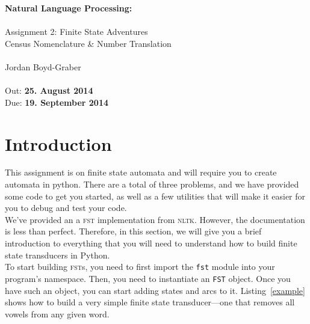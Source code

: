 \documentclass[11pt]{article}
\begin{document}
\begin{center}
{\Large{\textbf{ Natural Language Processing:  }}}\\
\mbox{}\\
{\Large{Assignment 2: Finite State Adventures\\Census Nomenclature \& Number Translation}}\\
\mbox{}\\
{\large{Jordan Boyd-Graber}}\\
\mbox{}\\
{\large{Out: \textbf{25. August 2014}\\Due: \textbf{19. September 2014}}}\\
\end{center}


{}

\section*{Introduction} %
\label{sec:introduction}

This assignment is on finite state automata and will require you to
create automata in python. There are a total of three problems, and we
have provided some code to get you started, as well as a few utilities
that will make it easier for you to debug and test your code.  \\

We've provided an a \textsc{fst} implementation from \textsc{nltk}.
However, the documentation is less than perfect. Therefore, in this
section, we will give you a brief introduction to everything that you
will need to understand how to build finite state transducers in Python.
\\

To start building \textsc{fst}s, you need to first import the
\texttt{fst} module into your program's namespace. Then, you need to
instantiate an \texttt{FST} object. Once you have such an object, you
can start adding states and arcs to it. Listing~\ref{example} shows
how to build a very simple finite state transducer---one that removes
all vowels from any given word.
\end{document}
